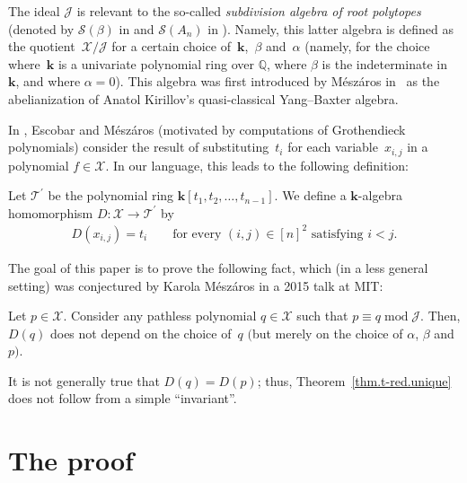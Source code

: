 The ideal $\mathcal{J}$ is relevant to the so-called \textit{subdivision algebra of root polytopes} (denoted by $\mathcal{S}(\beta) $ in \cite[Section~5]{EscMes15} and $\mathcal{S}(A_{n}) $ in \cite[Section~1]{Meszar09}). Namely, this latter algebra is defined as the quotient~$\mathcal{X}/\mathcal{J}$ for a certain choice of~$\mathbf{k}$,~$\beta$ and~$\alpha$ (namely, for the choice where~$\mathbf{k}$ is a univariate polynomial ring over $\mathbb{Q}$, where $\beta$ is the indeterminate in~$\mathbf{k}$, and where $\alpha=0$). This algebra was first introduced by M\'{e}sz\'{a}ros in~\cite{Meszar09} as the abelianization of Anatol Kirillov's quasi-classical
Yang--Baxter algebra.

In \cite[Section~5 and Appendix~A]{EscMes15}, Escobar and M\'{e}sz\'{a}ros (motivated by computations of Grothendieck polynomials) consider the result of substituting~$t_{i}$ for each variable~$x_{i,j}$ in a polynomial $f\in\mathcal{X}$. In our language, this leads to the following definition:

\begin{Definition}Let $\mathcal{T}^{\prime}$ be the polynomial ring $\mathbf{k} [ t_{1},t_{2},\ldots,t_{n-1}] $. We define a $\mathbf{k}$-algebra homomorphism $D\colon \mathcal{X}\rightarrow\mathcal{T}^{\prime}$ by
\begin{gather*}
D ( x_{i,j} ) =t_{i}\qquad \text{for every } (i,j) \in[n] ^{2}\text{ satisfying }i<j.
\end{gather*}
\end{Definition}

The goal of this paper is to prove the following fact, which (in a less general setting) was conjectured by Karola M\'{e}sz\'{a}ros in a 2015 talk at MIT:

\begin{Theorem}\label{thm.t-red.unique}Let $p\in\mathcal{X}$. Consider any pathless polynomial $q\in\mathcal{X}$ such that $p\equiv q\operatorname{mod} \mathcal{J}$. Then, $D(q) $ does not depend on the choice of~$q$ $($but merely on the choice of $\alpha$, $\beta$ and~$p)$.
\end{Theorem}

It is not generally true that $D(q) =D(p) $; thus, Theorem~\ref{thm.t-red.unique} does not follow from a simple ``invariant''.

\section{The proof}\label{sect.proof}


